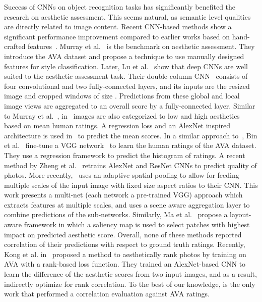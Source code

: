 \documentclass[10pt,twocolumn,twoside]{IEEEtran}
\begin{document}
Success of CNNs on object recognition tasks has significantly benefited the research on aesthetic assessment. This seems natural, as semantic level qualities are directly related to image content. Recent CNN-based methods \cite{lu2015deep, kao2015visual, jin2016image, mai2016composition, kim2017deep} show a significant performance improvement compared to earlier works based on hand-crafted features~\cite{murray2012ava}. Murray et al.~\cite{murray2012ava} is the benchmark on aesthetic assessment. They introduce the AVA dataset and propose a technique to use manually designed features for style classification. Later, Lu et al.~\cite{lu2015deep, lu2015rating} show that deep CNNs are well suited to the aesthetic assessment task. Their double-column CNN~\cite{lu2015rating} consists of four convolutional and two fully-connected layers, and its inputs are the resized image and cropped windows of size . Predictions from these global and local image views are aggregated to an overall score by a fully-connected layer. Similar to Murray et al.~\cite{murray2012ava}, in~\cite{lu2015rating} images are also categorized to low and high aesthetics based on mean human ratings. A regression loss and an AlexNet inspired  architecture is used in~\cite{kao2015visual} to predict the mean scores. In a similar approach to~\cite{kao2015visual}, Bin et al.~\cite{jin2016image} fine-tune a VGG network~\cite{simonyan2014very} to learn the human ratings of the AVA dataset. They use a regression framework to predict the histogram of ratings. A recent method by Zheng et al.~\cite{zeng2017probabilistic} retrains AlexNet and ResNet CNNs to predict quality of photos. More recently,~\cite{mai2016composition} uses an adaptive spatial pooling to allow for feeding multiple scales of the input image with fixed size aspect ratios to their CNN. This work presents a multi-net (each network a pre-trained VGG) approach which extracts features at multiple scales, and uses a scene aware aggregation layer to combine predictions of the sub-networks. Similarly, Ma et al.~\cite{ma2017lamp} propose a layout-aware framework in which a saliency map is used to select patches with highest impact on predicted aesthetic score. Overall, none of these methods reported correlation of their predictions with respect to ground truth ratings. Recently, Kong et al. in~\cite{kong2016photo} proposed a method to aesthetically rank photos by training on AVA with a rank-based loss function. They trained an AlexNet-based CNN to learn the difference of the aesthetic scores from two input images, and as a result, indirectly optimize for rank correlation. To the best of our knowledge, \cite{kong2016photo} is the only work that performed a correlation evaluation against AVA ratings.
\end{document}
